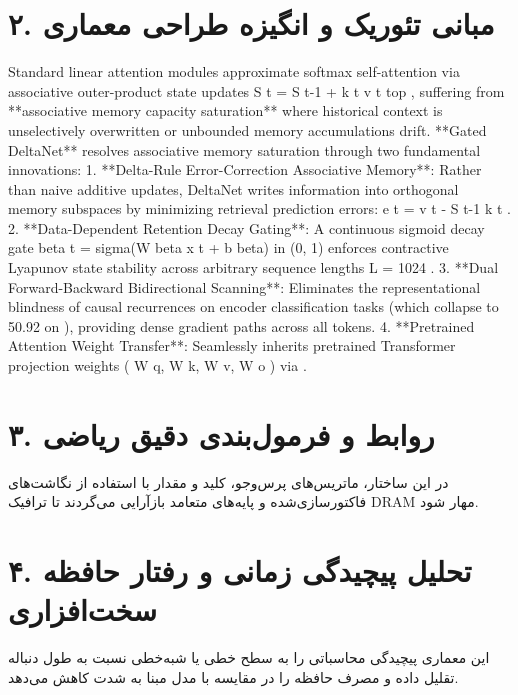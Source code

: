 \documentclass[12pt,a4paper]{article}
\begin{document}
\section*{۲. مبانی تئوریک و انگیزه طراحی معماری}
Standard linear attention modules approximate softmax self-attention via associative outer-product state updates S t = S t-1 + k t v t top , suffering from **associative memory capacity saturation** where historical context is unselectively overwritten or unbounded memory accumulations drift. **Gated DeltaNet** resolves associative memory saturation through two fundamental innovations: 1. **Delta-Rule Error-Correction Associative Memory**: Rather than naive additive updates, DeltaNet writes information into orthogonal memory subspaces by minimizing retrieval prediction errors: e t = v t - S t-1 k t . 2. **Data-Dependent Retention Decay Gating**: A continuous sigmoid decay gate beta t = sigma(W beta x t + b beta) in (0, 1) enforces contractive Lyapunov state stability across arbitrary sequence lengths L = 1024 . 3. **Dual Forward-Backward Bidirectional Scanning**: Eliminates the representational blindness of causal recurrences on encoder classification tasks (which collapse to 50.92 on ), providing dense gradient paths across all tokens. 4. **Pretrained Attention Weight Transfer**: Seamlessly inherits pretrained Transformer projection weights ( W q, W k, W v, W o ) via .

\section*{۳. روابط و فرمول‌بندی دقیق ریاضی}
در این ساختار، ماتریس‌های پرس‌وجو، کلید و مقدار با استفاده از نگاشت‌های فاکتورسازی‌شده و پایه‌های متعامد بازآرایی می‌گردند تا ترافیک DRAM مهار شود.

\section*{۴. تحلیل پیچیدگی زمانی و رفتار حافظه سخت‌افزاری}
این معماری پیچیدگی محاسباتی را به سطح خطی یا شبه‌خطی نسبت به طول دنباله تقلیل داده و مصرف حافظه را در مقایسه با مدل مبنا به شدت کاهش می‌دهد.
\end{document}
